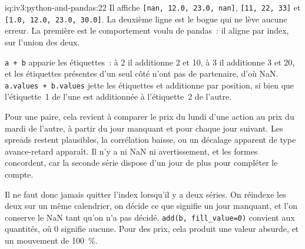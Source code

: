 \begin{solution}{iq:iv3:python-and-pandas:22}
Il affiche \texttt{[nan, 12.0, 23.0, nan]}, \texttt{[11, 22, 33]} et \texttt{[1.0, 12.0, 23.0, 30.0]}. La deuxième ligne est le bogue qui ne lève aucune erreur. La première est le comportement voulu de pandas~: il aligne par index, sur l'union des deux.

\texttt{a + b} apparie les étiquettes~: à 2 il additionne 2 et 10, à 3 il additionne 3 et 20, et les étiquettes présentes d'un seul côté n'ont pas de partenaire, d'où NaN. \texttt{a.values + b.values} jette les étiquettes et additionne par position, si bien que l'étiquette~1 de l'une est additionnée à l'étiquette~2 de l'autre.

Pour une paire, cela revient à comparer le prix du lundi d'une action au prix du mardi de l'autre, à partir du jour manquant et pour chaque jour suivant. Les spreads restent plausibles, la corrélation baisse, ou un décalage apparent de type avance-retard apparaît. Il n'y a ni NaN ni avertissement, et les formes concordent, car la seconde série dispose d'un jour de plus pour compléter le compte.

Il ne faut donc jamais quitter l'index lorsqu'il y a deux séries. On réindexe les deux sur un même calendrier, on décide ce que signifie un jour manquant, et l'on conserve le NaN tant qu'on n'a pas décidé. \texttt{add(b, fill\_value=0)} convient aux quantités, où 0 signifie aucune. Pour des prix, cela produit une valeur absurde, et un mouvement de 100~\%.

\end{solution}

